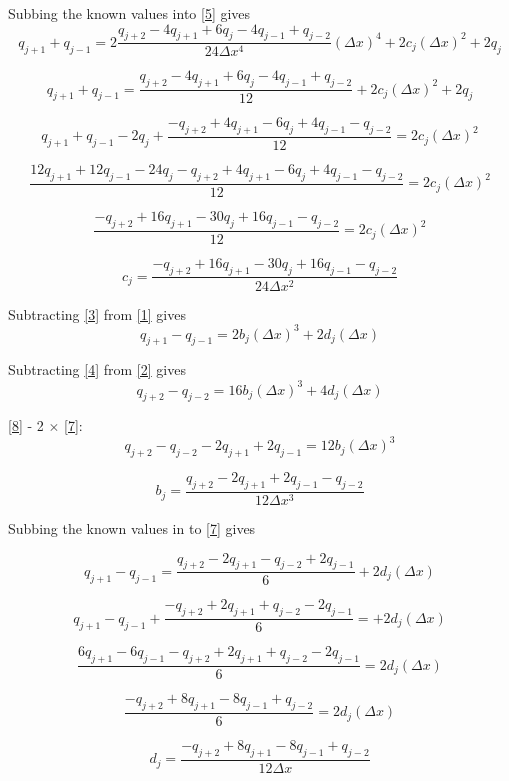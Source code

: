 \documentclass[12pt]{article}
\begin{document}
Subbing the known values into \eqref{5} gives
\[q_{j+1} + q_{j-1} = 2\frac{q_{j+2} -4q_{j+1} + 6q_j -4q_{j-1}  + q_{j-2}}{24 \Delta x^4 }(\Delta x)^4 + 2c_j(\Delta x)^2 + 2q_j\]

\[q_{j+1} + q_{j-1} = \frac{q_{j+2} -4q_{j+1} + 6q_j -4q_{j-1}  + q_{j-2}}{12 } + 2c_j(\Delta x)^2 + 2q_j\]

\[q_{j+1} + q_{j-1} - 2q_j +  \frac{-q_{j+2} +4q_{j+1} - 6q_j +4q_{j-1}  - q_{j-2}}{12 } = 2c_j(\Delta x)^2\]

\[\frac{12q_{j+1} + 12q_{j-1} - 24q_j -q_{j+2} +4q_{j+1} - 6q_j +4q_{j-1}  - q_{j-2}}{12 } = 2c_j(\Delta x)^2\]

\[\frac{-q_{j+2} +16q_{j+1} - 30q_j + 16q_{j-1}  - q_{j-2}}{12 } = 2c_j(\Delta x)^2\]

\begin{equation}
\label{c}
c_j = \frac{-q_{j+2} +16q_{j+1} - 30q_j + 16q_{j-1}  - q_{j-2}}{24 \Delta x^2 }
\end{equation}

Subtracting \eqref{3} from \eqref{1} gives
\begin{equation}
\label{7}
q_{j+1} - q_{j-1} = 2b_j(\Delta x)^3 + 2d_j(\Delta x)
\end{equation}

Subtracting \eqref{4} from \eqref{2} gives
\begin{equation}
\label{8}
q_{j+2} - q_{j-2}  = 16b_j(\Delta x)^3 + 4d_j(\Delta x)
\end{equation}

\eqref{8} - 2 $\times$ \eqref{7}:
\[q_{j+2} - q_{j-2} - 2q_{j+1} + 2q_{j-1} = 12b_j(\Delta x)^3\]

\begin{equation}
\label{b}
b_j = \frac{q_{j+2} - 2q_{j+1} + 2q_{j-1} - q_{j-2}}{12 \Delta x^3 }
\end{equation}

Subbing the known values in to  \eqref{7} gives

\[q_{j+1} - q_{j-1} = \frac{q_{j+2} - 2q_{j+1} - q_{j-2} + 2q_{j-1}}{6} + 2d_j(\Delta x) \]

\[q_{j+1} - q_{j-1} + \frac{-q_{j+2} + 2q_{j+1} + q_{j-2} - 2q_{j-1}}{6} = + 2d_j(\Delta x) \]

\[\frac{6q_{j+1} - 6q_{j-1}  -q_{j+2} + 2q_{j+1} + q_{j-2} - 2q_{j-1}}{6} = 2d_j(\Delta x) \]

\[\frac{-q_{j+2} + 8q_{j+1} - 8q_{j-1} + q_{j-2}}{6} = 2d_j(\Delta x) \]

\begin{equation}
\label{d}
d_j = \frac{-q_{j+2} + 8q_{j+1} - 8q_{j-1} + q_{j-2}}{12\Delta x}
\end{equation}
\end{document}
